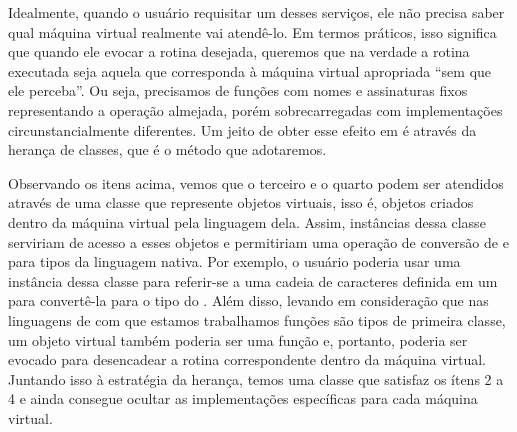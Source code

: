     Idealmente, quando o usuário requisitar um desses serviços, ele não precisa
    saber qual máquina virtual realmente vai atendê-lo. Em termos práticos, isso
    significa que quando ele evocar a rotina desejada, queremos que na verdade a
    rotina executada seja aquela que corresponda à máquina virtual apropriada
    ``sem que ele perceba''. Ou seja, precisamos de funções com nomes e
    assinaturas\footnotemark{} fixos representando a operação almejada, porém
    sobrecarregadas com implementações circunstancialmente diferentes. Um jeito
    de obter esse efeito em \CXX{} é através da herança de classes, que é o
    método que adotaremos.


    Observando os itens acima, vemos que o terceiro e o quarto podem ser
    atendidos através de uma classe que represente objetos virtuais, isso é,
    objetos criados dentro da máquina virtual pela linguagem dela. Assim,
    instâncias dessa classe serviriam de acesso a esses objetos e permitiriam
    uma operação de conversão de e para tipos da linguagem nativa. Por exemplo,
    o usuário poderia usar uma instância dessa classe para referir-se a uma
    cadeia de caracteres definida em um \script{} para convertê-la para o tipo
     do \CXX{}. Além disso, levando em consideração que nas
    linguagens de \script{} com que estamos trabalhamos funções são tipos de
    primeira classe\footnotemark{}, um objeto virtual também poderia ser uma
    função e, portanto, poderia ser evocado para desencadear a rotina
    correspondente dentro da máquina virtual. Juntando isso à estratégia da
    herança, temos uma classe que satisfaz os ítens 2 a 4 e ainda consegue
    ocultar as implementações específicas para cada máquina virtual.




